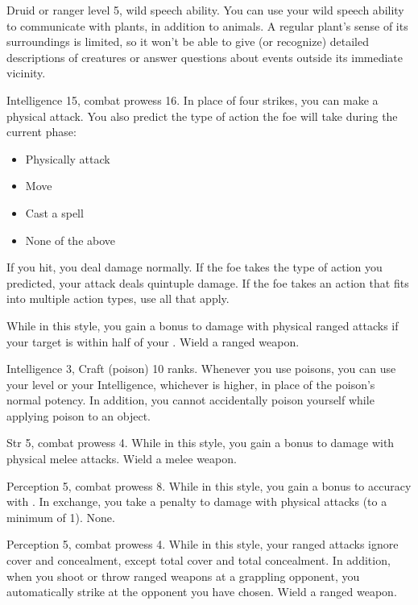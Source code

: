 \featpres Druid or ranger level 5, wild speech ability.
\featben You can use your wild speech ability to communicate with plants, in addition to animals.
A regular plant's sense of its surroundings is limited, so it won't be able to give (or recognize) detailed descriptions of creatures or answer questions about events outside its immediate vicinity.

\featpres Intelligence 15, combat prowess 16.
\featben In place of four strikes, you can make a physical attack.
You also predict the type of action the foe will take during the current phase:
\begin{itemize}
    \item Physically attack
    \item Move
    \item Cast a spell
    \item None of the above
\end{itemize}
If you hit, you deal damage normally.
If the foe takes the type of action you predicted, your attack deals quintuple damage.
If the foe takes an action that fits into multiple action types, use all that apply.

\featben While in this style, you gain a  bonus to damage with physical ranged attacks if your target is within half of your .
\stylereq Wield a ranged weapon.

\featpres Intelligence 3, Craft (poison) 10 ranks.
\featben Whenever you use poisons, you can use your level or your Intelligence, whichever is higher, in place of the poison's normal potency.
In addition, you cannot accidentally poison yourself while applying poison to an object.

\featpres Str 5, combat prowess 4.
\featben While in this style, you gain a  bonus to damage with physical melee attacks.
\stylereq Wield a melee weapon.

\featpres Perception 5, combat prowess 8.
\featben While in this style, you gain a  bonus to accuracy with .
In exchange, you take a  penalty to damage with physical attacks (to a minimum of 1).
\stylereq None.

\featpres Perception 5, combat prowess 4.
\featben While in this style, your ranged attacks ignore cover and concealment, except total cover and total concealment.
In addition, when you shoot or throw ranged weapons at a grappling opponent, you automatically strike at the opponent you have chosen.
\stylereq Wield a ranged weapon.

